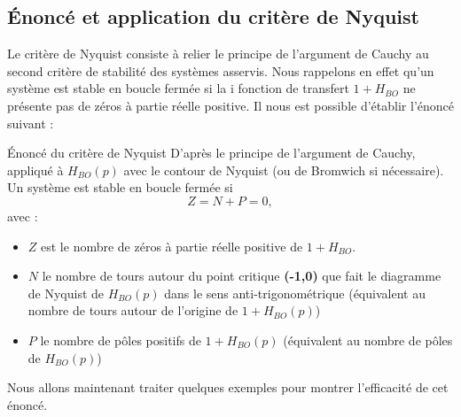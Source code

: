 \subsection{\'Enoncé et application du critère de Nyquist}
Le critère de Nyquist consiste à relier le principe de l'argument de Cauchy au 
second critère de stabilité des systèmes asservis\label{critere2}.
Nous rappelons en effet qu'un système est stable en boucle fermée si la i
fonction de transfert $1+H_{BO}$ ne présente pas de zéros à partie réelle 
positive. Il nous est possible d'établir l'énoncé suivant :
\begin{btheorem}{\'Enoncé du critère de Nyquist
    } 
D'après le principe de l'argument de Cauchy, appliqué à $H_{BO}(p)$ avec le 
contour de Nyquist (ou de Bromwich si nécessaire). Un système est stable en 
boucle fermée si 
\[
    Z=N+P=0,
\]
avec :
\begin{itemize}
    \item $Z$ est le nombre de zéros à partie réelle positive de $1+H_{BO}$.  
    \item $N$ le nombre de tours autour du point critique \textbf{(-1,0)} que 
          fait le diagramme de Nyquist de $H_{BO}(p)$ dans le sens 
          anti-trigonométrique
          (équivalent au nombre de tours autour de l'origine de $1+H_{BO}(p)$)
    \item $P$ le nombre de pôles positifs de $1+H_{BO}(p)$ (équivalent au 
          nombre de pôles de $H_{BO}(p)$)
\end{itemize}
\end{btheorem}
Nous allons maintenant traiter quelques exemples pour montrer l'efficacité
de cet énoncé.
